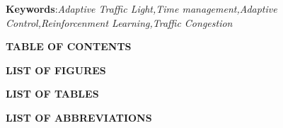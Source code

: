 \documentclass[12pt, a4paper, oneside]{article}
\begin{document}
\textbf{Keywords}:\textit{Adaptive Traffic Light,Time management,Adaptive Control,Reinforcenment Learning,Traffic Congestion}\\

\break







\large
{}
\begin{center}
	\textbf{TABLE OF CONTENTS}
\end{center}
\normalsize
\setlength{\cftbeforetoctitleskip}{0pt}
\renewcommand{\contentsname}{}
\tableofcontents

\break










\large
{}
\begin{center}
	\textbf{LIST OF FIGURES}
\end{center}
\renewcommand{\listfigurename}{}
\normalsize
\listoffigures

\break






\large
{}
\begin{center}
	\textbf{LIST OF TABLES}
\end{center}
\renewcommand{\listtablename}{}
\normalsize
\listoftables

\break












\large
{}
\begin{center}
	\textbf{LIST OF ABBREVIATIONS}
\end{center}
\end{document}
